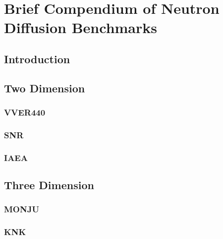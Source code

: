 \chapter{Brief Compendium of Neutron Diffusion Benchmarks}
\label{ap:benchmarks}

\section{Introduction}
\section{Two Dimension}
  \subsection{VVER440}
  \subsection{SNR}
  \subsection{IAEA}
\section{Three Dimension}
  \subsection{MONJU}
  \subsection{KNK}

